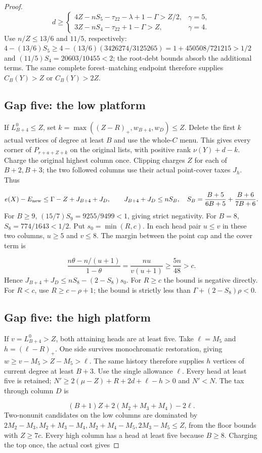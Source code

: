 \documentclass[11pt,a4paper]{article}
\theoremstyle{definition}
\begin{document}
\begin{proof}
\[
d\ge
\begin{cases}
4Z-nS_5-\tau_{22}-\lambda+1-\Gamma>Z/2,&\gamma=5,\\
3Z-nS_4-\tau_{22}+1-\Gamma>Z,&\gamma=4.
\end{cases}
\]
Use $n/Z\le13/6$ and $11/5$, respectively:
$4-(13/6)S_5\ge4-(13/6)(3426274/3125265)=1+450508/721215>1/2$ and
$(11/5)S_4=20603/10455<2$; the root-debt bounds absorb the additional terms.
The same complete forest--matching endpoint therefore supplies
$C_B(Y)>Z$ or $C_B(Y)>2Z$.

\subsection*{Gap five: the low platform}
If $L_{B+4}^0\le Z$, set
$k=\max((Z-R)_+,w_{B+4},w_D)\le Z$.
Delete the first $k$ actual vertices of degree at least $B$
and use the whole-$C$ menu.
This gives every corner of $P_{r+a+Z+k}$ on the original lists,
with positive rank $\nu(Y)+d-k$.
Charge the original highest column once.
Clipping charges $Z$ for each of $B+2,B+3$;
the two followed columns use their actual point-cover taxes $J_h$.
Thus

\[
e(X)-E_{\rm new}\le\Gamma-Z+J_{B+4}+J_D,\qquad
J_{B+4}+J_D\le nS_B,\quad
S_B=\frac{B+5}{6B+5}+\frac{B+6}{7B+6}.
\]
For $B\ge9$, $(15/7)S_9=9255/9499<1$, giving strict negativity.
For $B=8$, $S_8=774/1643<1/2$.
Put $s_0=\min(R,c)$. In each head pair $u\le v$ in these two columns,
$u\ge5$ and $v\le8$. The margin between the point cap and the cover term is

\[
\frac{n\theta-n/(u+1)}{1-\theta}=\frac{nu}{v(u+1)}
\ge\frac{5n}{48}>c.
\]
Hence $J_{B+4}+J_D\le nS_8-(2-S_8)s_0$.
For $R\ge c$ the bound is negative directly.
For $R<c$, use $R\ge c-\rho+1$; the bound is strictly less than
$\Gamma+(2-S_8)\rho<0$.

\subsection*{Gap five: the high platform}
If $v=L_{B+4}^0>Z$, both attaining heads are at least five.
Take $\ell=M_5$ and $h=(\ell-R)_+$.
One side survives monochromatic restoration, giving
$w\ge v-M_5>Z-M_5>\ell$.
The same history therefore supplies $h$ vertices of current degree at least $B+3$.
Use the single allowance $\ell$. Every head at least five is retained;
$N'\ge2(\mu-Z)+R+2d+\ell-h>0$ and $N'<N$.
The tax through column $D$ is

\[
(B+1)Z+2(M_2+M_3+M_4)-2\ell.
\]
Two-nonunit candidates on the low columns are dominated by
$2M_2-M_3,M_2+M_3-M_4,M_2+M_4-M_5,2M_3-M_5\le Z$,
from the floor bounds with $Z\ge7c$.
Every high column has a head at least five because $B\ge8$.
Charging the top once, the actual cost gives


\end{proof}
\end{document}
